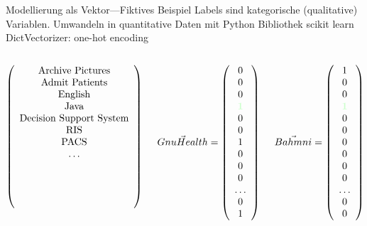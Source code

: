 \documentclass[aspectratio=1610,handout]{beamer}
\newcommand{\both}[1]{{\color[rgb]{0.8,1,0.8}\textbf{#1}}}
\begin{document}
\begin{frame}{Modellierung als Vektor---Fiktives Beispiel}
Labels sind kategorische (qualitative) Variablen. Umwandeln in quantitative Daten mit Python Bibliothek scikit learn DictVectorizer: one-hot encoding
\begin{columns}
 
 \begin{column}{.4\textwidth}
   \[\left(\begin{array}{c} \textnormal{Archive Pictures} \\ \textnormal{Admit Patients} \\ \textnormal{English} \\ \textnormal{Java} \\ \textnormal{Decision Support System} \\ \textnormal{RIS} \\ \textnormal{PACS} \\ \dots \\ \\ \\ \\ \\ \end{array}\right) \]
 \end{column}
 
 \begin{column}{.25\textwidth}
   \[\vec{GnuHealth}	= \left(\begin{array}{c} 0 \\ 0 \\ 0 \\ \both{1} \\ 0 \\ 0 \\ 1 \\ 0 \\ 0 \\ 0 \\ \ldots \\ 0 \\ 1 \end{array}\right) \]
 \end{column}

 \begin{column}{.25\textwidth}
   \[\vec{Bahmni}		= \left(\begin{array}{c} 1 \\ 0 \\ 0 \\ \both{1} \\ 0 \\ 0 \\ 0 \\ 0 \\ 0 \\ 0 \\ \ldots \\ 0 \\ 0 \end{array}\right) \]
 \end{column}
\end{columns}

\end{frame}
\end{document}
